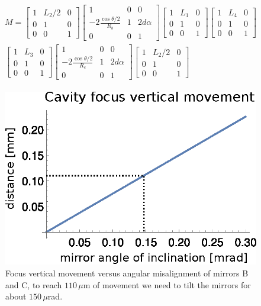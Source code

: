 \begin{align}
\begin{split}
M = 
\begin{bmatrix}
1 & L_2/2 & 0\\
0 & 1 & 0\\
0 & 0 & 1
\end{bmatrix}
\begin{bmatrix}
1 & 0 & 0\\
-2\frac{\cos\theta/2}{R_{b}} & 1 & 2d\alpha\\
0 & 0 & 1
\end{bmatrix}
\begin{bmatrix}
1 & L_1 & 0\\
0 & 1 & 0\\
0 & 0 & 1
\end{bmatrix}
\begin{bmatrix}
1 & L_4 & 0\\
0 & 1 & 0\\
0 & 0 & 1
\end{bmatrix}\\
\begin{bmatrix}
1 & L_3 & 0\\
0 & 1 & 0\\
0 & 0 & 1
\end{bmatrix}
\begin{bmatrix}
1 & 0 & 0\\
-2\frac{\cos\theta/2}{R_{c}} & 1 & 2d\alpha\\
0 & 0 & 1
\end{bmatrix}
\begin{bmatrix}
1 & L_2/2 & 0\\
0 & 1 & 0\\
0 & 0 & 1
\end{bmatrix}
\end{split}
\end{align}
\begin{figure}
	\centering
	\includegraphics[width=0.8\linewidth]{images/shiftfocus.eps}
	\caption{Focus vertical movement versus angular misalignment of mirrors B and C, to reach $110\,\mu$m of movement we need to tilt the mirrors for about $150\,\mu$rad.}
	\label{fig:shiftfocus}
\end{figure}
